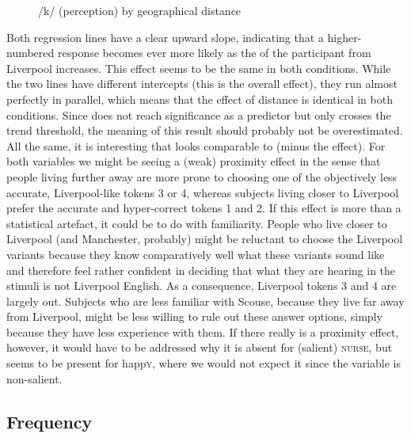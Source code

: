 \begin{figure}
	
		\resizebox{.49\linewidth}{!}{} 
	\caption{/k/ (perception) by geographical distance}
	\label{fig.scatter.k.ext.dist}
\end{figure}

\newpage 
Both regression lines have a clear upward slope, indicating that a higher-num\-bered response becomes ever more likely as the  of the participant from Liverpool increases.
This effect seems to be the same in both conditions.
While the two lines have different intercepts (this is the overall  effect), they run almost perfectly in parallel, which means that the effect of distance is identical in both conditions.
Since  does not reach significance as a predictor but only crosses the trend threshold, the meaning of this result should probably not be overestimated.
All the same, it is interesting that  looks comparable to  (minus the  effect).
For both variables we might be seeing a (weak) proximity effect in the sense that people living further away are more prone to choosing one of the objectively less accurate, Liverpool-like tokens 3 or 4, whereas subjects living closer to Liverpool prefer the accurate and hyper-correct tokens 1 and 2.
If this effect is more than a statistical artefact, it could be to do with familiarity.
People who live closer to Liverpool (and Manchester, probably) might be reluctant to choose the Liverpool variants because they know comparatively well what these variants sound like and therefore feel rather confident in deciding that what they are hearing in the stimuli is not Liverpool English.
As a consequence, Liverpool tokens 3 and 4 are largely out.
Subjects who are less familiar with Scouse, because they live far away from Liverpool, might be less willing to rule out these answer options, simply because they have less experience with them.
If there really is a proximity effect, however, it would have to be addressed why it is absent for (salient) \textsc{nurse},  but seems to be present for happ\textsc{y}, where we would not expect it since the variable is non-salient.

\subsection{Frequency}
\label{sec.perc_res.k.frequency}

